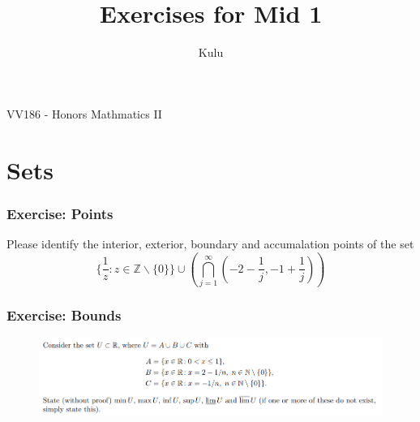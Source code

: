 \documentclass{beamer}
\title{\sffamily Exercises for Mid 1}
\institute[UM-SJTU JI]{University of Michigan-Shanghai Jiao Tong University Joint Institute}
\author{Kulu}
\newcommand{\myfont}{\rmfamily\normalsize\upshape\mdseries}
\begin{document}
\begin{titlepage}
    \begin{center}
        VV186 - Honors Mathmatics II
    \end{center}
\end{titlepage}
\myfont

\section{Sets}
\begin{frame}
    \frametitle{Exercise: Points}
    Please identify the interior, exterior, boundary and accumalation
    points of the set
    $$\{\frac{1}{z}:z\in \mathbb{Z}\backslash\{0\}\}\cup (\bigcap_{j=1}^\infty(-2-\frac{1}{j},-1+\frac{1}{j}))$$
\end{frame}

\begin{frame}
    \frametitle{Exercise: Bounds}
    \begin{figure}[htbp]
        \centering
        \includegraphics[width=12cm]{boundExercise.png}
    \end{figure}
\end{frame}
\end{document}
